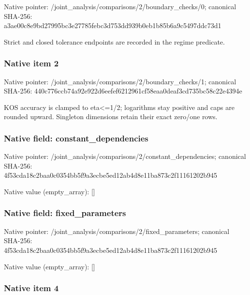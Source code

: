\documentclass[10pt,a4paper]{article}
\begin{document}
Native pointer: /joint\_analysis/comparis\allowbreak{}ons/2/boundary\_checks/0; canonical SHA-256: a3ae00c8e9bd27995bc3e277\allowbreak{}85febc3d753dd939b0eb1b85\allowbreak{}b6a9c5497ddc73d1


Strict and closed tolerance endpoints are recorded in the regime predicate.


\subsubsection{Native item 2}


Native pointer: /joint\_analysis/comparis\allowbreak{}ons/2/boundary\_checks/1; canonical SHA-256: 440c776ccb74a92e922d6eef\allowbreak{}ef6212961cf58eaa0deaf3cd\allowbreak{}735bc58c22e4394e


KOS accuracy is clamped to eta<=1/2; logarithms stay positive and caps are rounded upward. Singleton dimensions retain their exact zero/one rows.


\subsubsection{Native field: constant\_dependencies}


Native pointer: /joint\_analysis/comparis\allowbreak{}ons/2/constant\_dependenc\allowbreak{}ies; canonical SHA-256: 4f53cda18c2baa0c0354bb5f\allowbreak{}9a3ecbe5ed12ab4d8e11ba87\allowbreak{}3c2f11161202b945



Native value (empty\_array): []



\subsubsection{Native field: fixed\_parameters}


Native pointer: /joint\_analysis/comparis\allowbreak{}ons/2/fixed\_parameters; canonical SHA-256: 4f53cda18c2baa0c0354bb5f\allowbreak{}9a3ecbe5ed12ab4d8e11ba87\allowbreak{}3c2f11161202b945



Native value (empty\_array): []



\subsubsection{Native item 4}
\end{document}
